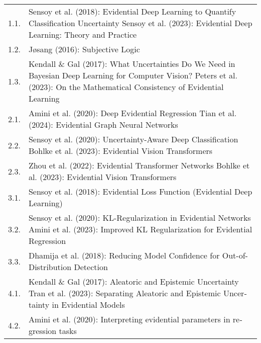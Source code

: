 \begin{otherlanguage}{ngerman}
\begin{table}[htbp]
\begin{tabularx}{\textwidth}{|l|X|}
1.1. & Sensoy et al. (2018): Evidential Deep Learning to Quantify Classification Uncertainty \cite{sensoy2018evidential} \newline
         Sensoy et al. (2023): Evidential Deep Learning: Theory and Practice \cite{sensoy2023tutorial} \\ 
1.2. & Jøsang (2016): Subjective Logic \cite{josang2016subjective} \\ 
1.3. & Kendall \& Gal (2017): What Uncertainties Do We Need in Bayesian Deep Learning for Computer Vision? \cite{kendall2017uncertainties} \newline
         Peters et al. (2023): On the Mathematical Consistency of Evidential Learning \cite{peters2023consistency} \\ \hline

2.1. & Amini et al. (2020): Deep Evidential Regression \cite{amini2020deep} \newline
         Tian et al. (2024): Evidential Graph Neural Networks \cite{tian2024egnn} \\ 
2.2. & Sensoy et al. (2020): Uncertainty-Aware Deep Classification \cite{sensoy2020uncertainty} \newline
         Bohlke et al. (2023): Evidential Vision Transformers \cite{bohlke2023evidentialvit} \\ 
2.3. & Zhou et al. (2022): Evidential Transformer Networks \cite{zhou2022evidential} \newline
         Bohlke et al. (2023): Evidential Vision Transformers \cite{bohlke2023evidentialvit} \\ \hline

3.1. & Sensoy et al. (2018): Evidential Loss Function (Evidential Deep Learning) \cite{sensoy2018evidential} \\ 
3.2. & Sensoy et al. (2020): KL-Regularization in Evidential Networks \cite{sensoy2020uncertainty} \newline
         Amini et al. (2023): Improved KL Regularization for Evidential Regression \cite{amini2023kl} \\ 
3.3. & Dhamija et al. (2018): Reducing Model Confidence for Out-of-Distribution Detection \cite{dhamija2018reducing} \\ \hline

4.1. & Kendall \& Gal (2017): Aleatoric and Epistemic Uncertainty \cite{kendall2017uncertainties} \newline
         Tran et al. (2023): Separating Aleatoric and Epistemic Uncertainty in Evidential Models \cite{tran2023separating} \\ 
4.2. & Amini et al. (2020): Interpreting evidential parameters in regression tasks \cite{amini2020deep} \\ \hline


\end{tabularx}
\end{table}
\end{otherlanguage}
